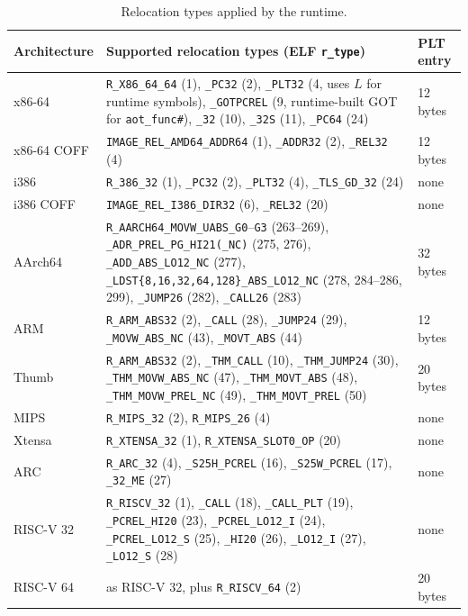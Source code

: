\documentclass{article}
\begin{document}
\begin{table}[H]
\centering
\begin{tabular}{lp{7.5cm}l}
    \hline
    Architecture & Supported relocation types (ELF \verb|r_type|) & PLT entry \\
    \hline
    x86-64 & \verb|R_X86_64_64| (1), \verb|_PC32| (2), \verb|_PLT32| (4, uses $L$ for runtime symbols), \verb|_GOTPCREL| (9, runtime-built GOT for \verb|aot_func#|), \verb|_32| (10), \verb|_32S| (11), \verb|_PC64| (24) & 12 bytes \\
    x86-64 COFF & \verb|IMAGE_REL_AMD64_ADDR64| (1), \verb|_ADDR32| (2), \verb|_REL32| (4) & 12 bytes \\
    i386 & \verb|R_386_32| (1), \verb|_PC32| (2), \verb|_PLT32| (4), \verb|_TLS_GD_32| (24) & none \\
    i386 COFF & \verb|IMAGE_REL_I386_DIR32| (6), \verb|_REL32| (20) & none \\
    AArch64 & \verb|R_AARCH64_MOVW_UABS_G0|--\verb|G3| (263--269), \verb|_ADR_PREL_PG_HI21(_NC)| (275, 276), \verb|_ADD_ABS_LO12_NC| (277), \verb|_LDST{8,16,32,64,128}_ABS_LO12_NC| (278, 284--286, 299), \verb|_JUMP26| (282), \verb|_CALL26| (283) & 32 bytes \\
    ARM & \verb|R_ARM_ABS32| (2), \verb|_CALL| (28), \verb|_JUMP24| (29), \verb|_MOVW_ABS_NC| (43), \verb|_MOVT_ABS| (44) & 12 bytes \\
    Thumb & \verb|R_ARM_ABS32| (2), \verb|_THM_CALL| (10), \verb|_THM_JUMP24| (30), \verb|_THM_MOVW_ABS_NC| (47), \verb|_THM_MOVT_ABS| (48), \verb|_THM_MOVW_PREL_NC| (49), \verb|_THM_MOVT_PREL| (50) & 20 bytes \\
    MIPS & \verb|R_MIPS_32| (2), \verb|R_MIPS_26| (4) & none \\
    Xtensa & \verb|R_XTENSA_32| (1), \verb|R_XTENSA_SLOT0_OP| (20) & none \\
    ARC & \verb|R_ARC_32| (4), \verb|_S25H_PCREL| (16), \verb|_S25W_PCREL| (17), \verb|_32_ME| (27) & none \\
    RISC-V 32 & \verb|R_RISCV_32| (1), \verb|_CALL| (18), \verb|_CALL_PLT| (19), \verb|_PCREL_HI20| (23), \verb|_PCREL_LO12_I| (24), \verb|_PCREL_LO12_S| (25), \verb|_HI20| (26), \verb|_LO12_I| (27), \verb|_LO12_S| (28) & none \\
    RISC-V 64 & as RISC-V 32, plus \verb|R_RISCV_64| (2) & 20 bytes \\
    \hline
\end{tabular}
\caption{Relocation types applied by the runtime.}
\label{table:reloc-arch}
\end{table}
\end{document}
